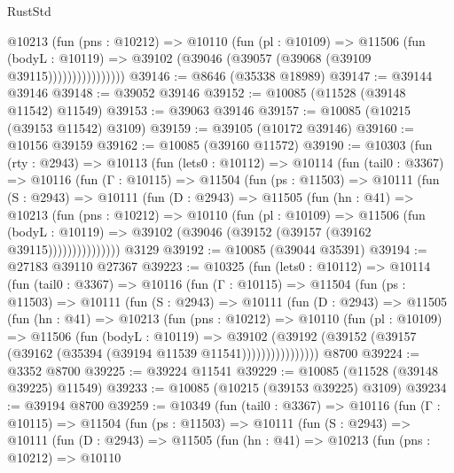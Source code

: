\begin{lexlean}{RustStd}
\begin{coremodule}
                    @10213
                      (fun (pns : @10212) =>
                      @10110
                        (fun (pl : @10109) =>
                        @11506
                          (fun (bodyL : @10119) =>
                          @39102 (@39046 (@39057 (@39068 (@39109 @39115))))))))))))))))
@39146 := @8646 (@35338 @18989)
@39147 := @39144 @39146
@39148 := @39052 @39146
@39152 := @10085 (@11528 (@39148 @11542) @11549)
@39153 := @39063 @39146
@39157 := @10085 (@10215 (@39153 @11542) @3109)
@39159 := @39105 (@10172 @39146)
@39160 := @10156 @39159
@39162 := @10085 (@39160 @11572)
@39190 := @10303
    (fun (rty : @2943) =>
    @10113
      (fun (lets0 : @10112) =>
      @10114
        (fun (tail0 : @3367) =>
        @10116
          (fun (Γ : @10115) =>
          @11504
            (fun (ps : @11503) =>
            @10111
              (fun (S : @2943) =>
              @10111
                (fun (D : @2943) =>
                @11505
                  (fun (hn : @41) =>
                  @10213
                    (fun (pns : @10212) =>
                    @10110
                      (fun (pl : @10109) =>
                      @11506
                        (fun (bodyL : @10119) =>
                        @39102 (@39046 (@39152 (@39157 (@39162 @39115)))))))))))))))
    @3129
@39192 := @10085 (@39044 @35391)
@39194 := @27183 @39110 @27367
@39223 := @10325
    (fun (lets0 : @10112) =>
    @10114
      (fun (tail0 : @3367) =>
      @10116
        (fun (Γ : @10115) =>
        @11504
          (fun (ps : @11503) =>
          @10111
            (fun (S : @2943) =>
            @10111
              (fun (D : @2943) =>
              @11505
                (fun (hn : @41) =>
                @10213
                  (fun (pns : @10212) =>
                  @10110
                    (fun (pl : @10109) =>
                    @11506
                      (fun (bodyL : @10119) =>
                      @39102
                        (@39192
                          (@39152 (@39157 (@39162 (@35394 (@39194 @11539 @11541))))))))))))))))
    @8700
@39224 := @3352 @8700
@39225 := @39224 @11541
@39229 := @10085 (@11528 (@39148 @39225) @11549)
@39233 := @10085 (@10215 (@39153 @39225) @3109)
@39234 := @39194 @8700
@39259 := @10349
    (fun (tail0 : @3367) =>
    @10116
      (fun (Γ : @10115) =>
      @11504
        (fun (ps : @11503) =>
        @10111
          (fun (S : @2943) =>
          @10111
            (fun (D : @2943) =>
            @11505
              (fun (hn : @41) =>
              @10213
                (fun (pns : @10212) =>
                @10110

\end{coremodule}
\end{lexlean}
